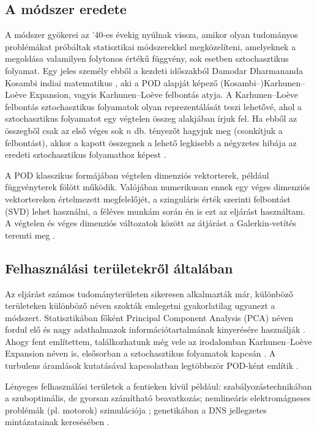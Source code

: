         \subsection{A módszer eredete}
            A módszer gyökerei az '40-es évekig nyúlnak vissza, amikor olyan tudományos problémákat próbáltak statisztikai módszerekkel megközelíteni, amelyeknek a megoldása valamilyen folytonos értékű függvény, sok esetben sztochasztikus folyamat. Egy jeles személy ebből a kezdeti időszakból Damodar Dharmananda Kosambi indiai matematikus \cite{Kosambi11}, aki a POD alapját képező (Kosambi--)Karhunen–Lo\`eve Expansion, vagyis Karhunen–Lo\`eve felbontás atyja. A Karhunen–Lo\`eve felbontás sztochasztikus folyamatok olyan reprezentálását teszi lehetővé, ahol a sztochasztikus folyamatot egy végtelen összeg alakjában írjuk fel. Ha ebből az összegből csak az első véges sok $n$ db. tényezőt hagyjuk meg (csonkítjuk a felbontást), akkor a kapott összegnek a lehető legkisebb a négyzetes hibája az eredeti sztochasztikus folyamathoz képest \cite{Aadithya18}.
            \par
            A POD klasszikus formájában végtelen dimenziós vektorterek, például függvényterek fölött működik. Valójában numerikusan ennek egy véges dimenziós vektortereken értelmezett megfelelőjét, a szinguláris érték szerinti felbontást (SVD) lehet használni, a féléves munkám során én is ezt az eljárást használtam. A végtelen és véges dimenziós változatok között az átjárást a Galerkin-vetítés teremti meg \cite{Holmes12}.
        \subsection{Felhasználási területekről általában}
            Az eljárást számos tudományterületen sikeresen alkalmazták már, különböző területeken különböző néven szokták emlegetni gyakorlatilag ugyanezt a módszert. Statisztikában főként Principal Component Analysis (PCA) néven fordul elő és nagy adathalmazok információtartalmának kinyerésére használják \cite{Jolliffe16}. Ahogy fent említettem, találkozhatunk még vele az irodalomban Karhunen–Lo\`eve Expansion néven is, elsősorban a sztochasztikus folyamatok kapcsán \cite{Aadithya18}. A turbulens áramlások kutatásával kapcsolatban legtöbbször POD-ként említik \cite{Sirovich}.
            \par
            Lényeges felhasználási területek a fentieken kívül például: szabályozástechnikában a szuboptimális, de gyorsan számítható beavatkozás; nemlineáris elektromágneses problémák (pl. motorok) szimulációja \cite{Henneron14}; genetikában a DNS jellegzetes mintázatainak keresésében \cite{Chicco15}.
